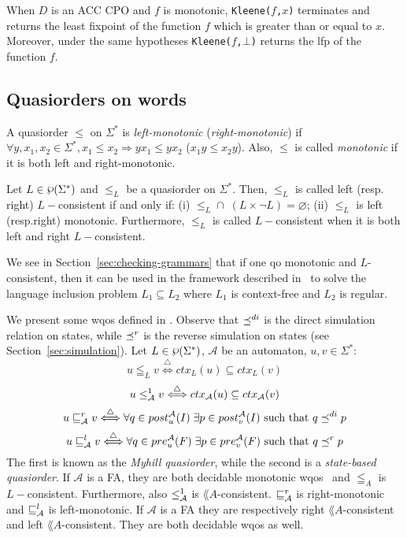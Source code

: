 When $D$ is an ACC CPO and $f$ is monotonic, \texttt{Kleene($f$,$x$)} terminates
and returns the least fixpoint of the function $f$ which is greater than or
equal to $x$.
Moreover, under the same hypotheses \texttt{Kleene($f$,$\bot$)} returns the
lfp of the function $f$.

\subsection{Quasiorders on words}
\label{sec:qos-on-words}

A quasiorder $\leq$ on $\Sigma^*$ is \emph{left-monotonic} (\emph{right-monotonic})
if $\forall y, x_1,x_2 \in \Sigma^*, x_1 \leq x_2 \Longrightarrow yx_1 \leq yx_2$
($x_1y \leq x_2y$).
Also, $\leq$ is called \emph{monotonic} if it is both left and right-monotonic.

\begin{definition}[L-consistency]
Let $L \in \powerset(\Sigma^*)$ and $\leq_L$ be a quasiorder on $\Sigma^*$.
Then, $\leq_L$ is called left (resp. right) $ L-$consistent if and only if:
(i) $\leq_L \cap \; (L \times \neg L) = \varnothing$;
(ii) $\leq_L$ is left (resp.right) monotonic.
Furthermore, $\leq_L$ is called $L-$consistent when it is both left and right $L-$consistent.
\end{definition}

We see in Section~\ref{sec:checking-grammars} that if one qo monotonic and $L$-consistent,
then it can be used in the framework described in~\cite{ganty2019language}
to solve the language inclusion problem $L_1 \subseteq L_2$ where $L_1$ is
context-free and $L_2$ is regular.

We present some wqos defined in \cite{ganty2019language}.
Observe that $\preceq^{di}$ is the direct simulation relation on states, while
$\preceq^r$ is the reverse simulation on states (see Section~\ref{sec:simulation}).
Let $L \in \powerset (\Sigma^*)$, $\mathcal{A}$ be an automaton, $u,v \in \Sigma^*$:
\[ u \leqq_{L} v \overset{\triangle}{  \Longleftrightarrow } ctx_L(u) \subseteq ctx_L(v)\]
\[ u \leq^1_{\mathcal{A}} v \overset{\triangle}{  \Longleftrightarrow } ctx_{\mathcal{A}}(u) \subseteq ctx_{\mathcal{A}}(v)\]
\[ u \sqsubseteq_{\mathcal{A}}^r v \overset{\triangle}{\Longleftrightarrow}
    \forall q \in post_u^{\mathcal{A}}(I) \; \exists p \in post_v^{\mathcal{A}}(I) \textrm{ such that } q \preceq^{di} p \]
\[ u \sqsubseteq_{\mathcal{A}}^l v \overset{\triangle}{\Longleftrightarrow}
    \forall q \in pre_u^{\mathcal{A}}(F) \; \exists p \in pre_v^{\mathcal{A}}(F) \textrm{ such that } q \preceq^r p \]
The first is known as the \emph{Myhill quasiorder}, while the second is
a \emph{state-based quasiorder}.
If $\mathcal{A}$ is a FA, they are both decidable monotonic wqos~\cite{ganty2019language} and
$\leqq_{A}$ is $L-$consistent.
Furthermore, also $\leq^1_{\mathcal{A}}$ is $\lang{A}$-consistent.
$\sqsubseteq_{\mathcal{A}}^r$ is right-monotonic and $\sqsubseteq_{\mathcal{A}}^l$ is left-monotonic.
If $\mathcal{A}$ is a FA they are respectively right $\lang{A}$-consistent
and left $\lang{A}$-consistent.
They are both decidable wqos as well.

